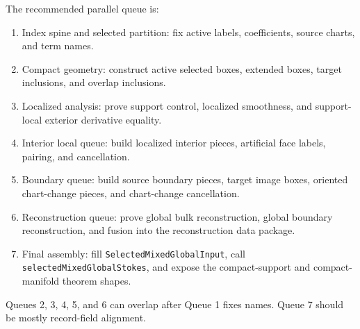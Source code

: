\begin{theorem}
  \label{obl:m7_parallel_worker_queue}
  The recommended parallel queue is:
  \begin{enumerate}
    \item Index spine and selected partition: fix active labels, coefficients,
      source charts, and term names.
    \item Compact geometry: construct active selected boxes, extended boxes,
      target inclusions, and overlap inclusions.
    \item Localized analysis: prove support control, localized smoothness, and
      support-local exterior derivative equality.
    \item Interior local queue: build localized interior pieces, artificial
      face labels, pairing, and cancellation.
    \item Boundary queue: build source boundary pieces, target image boxes,
      oriented chart-change pieces, and chart-change cancellation.
    \item Reconstruction queue: prove global bulk reconstruction, global
      boundary reconstruction, and fusion into the reconstruction data package.
    \item Final assembly: fill \texttt{SelectedMixedGlobalInput}, call
      \texttt{selectedMixedGlobalStokes}, and expose the compact-support and
      compact-manifold theorem shapes.
  \end{enumerate}
  Queues 2, 3, 4, 5, and 6 can overlap after Queue 1 fixes names.  Queue 7
  should be mostly record-field alignment.
\end{theorem}

